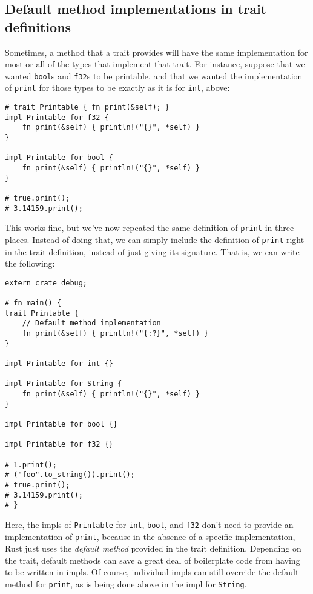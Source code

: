\documentclass[]{article}
\begin{document}
\subsection{Default method implementations in trait
definitions}\label{default-method-implementations-in-trait-definitions}

Sometimes, a method that a trait provides will have the same
implementation for most or all of the types that implement that trait.
For instance, suppose that we wanted \texttt{bool}s and \texttt{f32}s to
be printable, and that we wanted the implementation of \texttt{print}
for those types to be exactly as it is for \texttt{int}, above:

\begin{verbatim}
# trait Printable { fn print(&self); }
impl Printable for f32 {
    fn print(&self) { println!("{}", *self) }
}

impl Printable for bool {
    fn print(&self) { println!("{}", *self) }
}

# true.print();
# 3.14159.print();
\end{verbatim}

This works fine, but we've now repeated the same definition of
\texttt{print} in three places. Instead of doing that, we can simply
include the definition of \texttt{print} right in the trait definition,
instead of just giving its signature. That is, we can write the
following:

\begin{verbatim}
extern crate debug;

# fn main() {
trait Printable {
    // Default method implementation
    fn print(&self) { println!("{:?}", *self) }
}

impl Printable for int {}

impl Printable for String {
    fn print(&self) { println!("{}", *self) }
}

impl Printable for bool {}

impl Printable for f32 {}

# 1.print();
# ("foo".to_string()).print();
# true.print();
# 3.14159.print();
# }
\end{verbatim}

Here, the impls of \texttt{Printable} for \texttt{int}, \texttt{bool},
and \texttt{f32} don't need to provide an implementation of
\texttt{print}, because in the absence of a specific implementation,
Rust just uses the \emph{default method} provided in the trait
definition. Depending on the trait, default methods can save a great
deal of boilerplate code from having to be written in impls. Of course,
individual impls can still override the default method for
\texttt{print}, as is being done above in the impl for \texttt{String}.
\end{document}
